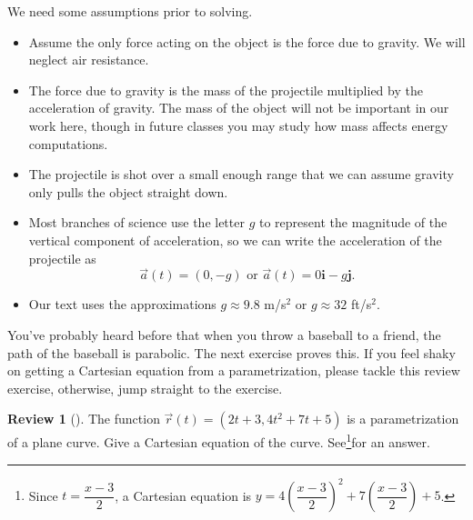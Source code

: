 \documentclass[10pt,]{book}
\theoremstyle{plain}
\theoremstyle{definition}
\theoremstyle{definition}
\theoremstyle{definition}
\newtheorem{project}{Review}[section]
\theoremstyle{definition}
\theoremstyle{definition}
\numberwithin{equation}{section}
\begin{document}
\par
We need some assumptions prior to solving. \leavevmode%
\begin{itemize}[label=\textbullet]
\item{}Assume the only force acting on the object is the force due to gravity. We will neglect air resistance.%
\item{}The force due to gravity is the mass of the projectile multiplied by the acceleration of gravity. The mass of the object will not be important in our work here, though in future classes you may study how mass affects energy computations.%
\item{}The projectile is shot over a small enough range that we can assume gravity only pulls the object straight down.%
\item{}Most branches of science use the letter \(g\) to represent the magnitude of the vertical component of acceleration, so we can write the acceleration of the projectile as%
\begin{equation*}
\vec a(t) = (0,-g)   \text{ or }   \vec a(t)= 0\textbf{i}-g\textbf{j}.
\end{equation*}
%
\item{}Our text uses the approximations \(g\approx 9.8\) m/s\(^2\) or \(g\approx32\) ft/s\(^2\).%
\end{itemize}
%
\par
You've probably heard before that when you throw a baseball to a friend, the path of the baseball is parabolic. The next exercise proves this. If you feel shaky on getting a Cartesian equation from a parametrization, please tackle this review exercise, otherwise, jump straight to the exercise.%
\begin{project}[]\label{project-8}
The function \(\vec r(t) = (2t+3, 4t^2+7t+5)\) is a parametrization of a plane curve. Give a Cartesian equation of the curve. See\footnote{Since \(t=\dfrac{x-3}{2}\), a Cartesian equation is \(y = 4\left(\dfrac{x-3}{2}\right)^2+7\left(\dfrac{x-3}{2}\right)+5\).\label{fn-7}}for an answer.%
\end{project}
\end{document}
